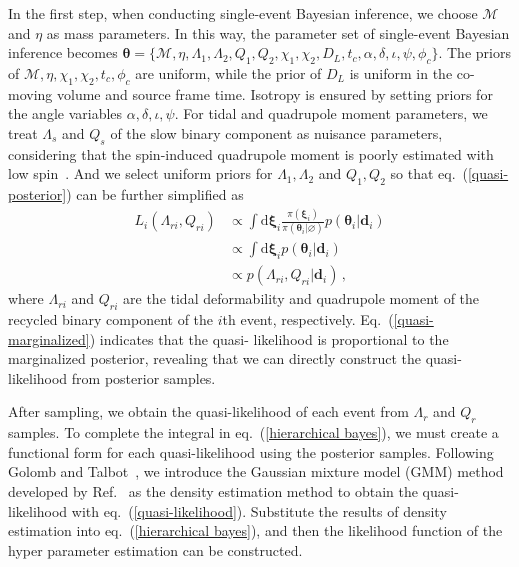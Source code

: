 \documentclass[a4paper,11pt]{article}
\begin{document}
In the first step, when conducting single-event Bayesian inference, we choose $\mathcal{M}$ and $\eta$ as mass parameters. 
In this way, the parameter set of single-event Bayesian inference becomes $\bm{\theta} = \{\mathcal{M},\eta,\Lambda_1,\Lambda_2,Q_1,Q_2,\chi_1,\chi_2,D_L,t_c,\alpha,\delta,\iota,\psi,\phi_c\}$. 
The priors of $\mathcal{M},\eta,\chi_1,\chi_2,t_c,\phi_c$ are uniform, while the prior of $D_L$ is uniform in the co-moving volume and source frame time. 
Isotropy is ensured by setting priors for the angle variables $\alpha,\delta,\iota,\psi$. For tidal and quadrupole moment parameters, we treat $\Lambda_s$ and $Q_s$ 
of the slow binary component as nuisance parameters, considering that the spin-induced quadrupole moment is poorly estimated with low spin~\cite{Yagi:2013awa}. 
And we select uniform priors for $\Lambda_1,\Lambda_2$ and $Q_1,Q_2$ so that eq.~(\ref{quasi-posterior}) can be further simplified as
\begin{equation}
    \label{quasi-marginalized}
    \begin{aligned}
        L_i(\Lambda_{ri},Q_{ri}) &\propto \int \text{d}\bm{\xi}_i \frac{\pi(\bm{\xi}_i)}{\pi(\bm{\theta}_i|\varnothing)}p(\bm{\theta}_i|\bm{d}_i) \\
        &\propto \int \text{d}\bm{\xi}_i p(\bm{\theta}_i|\bm{d}_i) \\
        &\propto p(\Lambda_{ri},Q_{ri}|\bm{d}_i)\,,
    \end{aligned}  
\end{equation}
where $\Lambda_{ri}$ and $Q_{ri}$ are the tidal deformability and quadrupole moment of the recycled 
binary component of the $i$th event, respectively. Eq.~(\ref{quasi-marginalized}) indicates that the quasi-
likelihood is proportional to the marginalized posterior, revealing that we can directly construct the quasi-
likelihood from posterior samples.

After sampling, we obtain the quasi-likelihood of each event from $\Lambda_r$ and $Q_r$ samples. To complete the integral in eq.~(\ref{hierarchical bayes}), 
we must create a functional form for each quasi-likelihood using the posterior samples. Following Golomb and Talbot~\cite{Golomb:2021tll}, 
we introduce the Gaussian mixture model (GMM) method developed by Ref.~\cite{Talbot:2020oeu} as the density estimation method to obtain the quasi-likelihood with eq.~(\ref{quasi-likelihood}). 
Substitute the results of density estimation into eq.~(\ref{hierarchical bayes}), and then the likelihood function of the hyper parameter estimation can be constructed.
\end{document}
